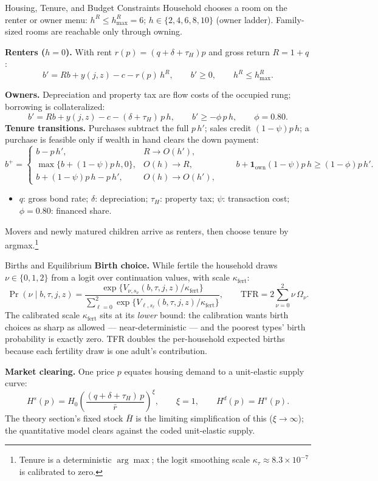 \documentclass[aspectratio=169,10pt]{beamer}
\providecommand{\1}{\mathbf 1}
\begin{document}
\begin{frame}{Housing, Tenure, and Budget Constraints}
  {\small Household chooses a room on the renter or owner menu: $h^R\le h^R_{\max}=6$; $h\in\{2,4,6,8,10\}$ (owner ladder). Family-sized rooms are reachable only through owning.}

  \textbf{Renters ($h=0$).} With rent $r(p)=(q+\delta+\tau_H)p$ and gross return $R=1+q$:
  \[
  b'=Rb+y(j,z)-c-r(p)\,h^R,\qquad b'\ge 0,\qquad h^R\le h^R_{\max}.
  \]

  \textbf{Owners.} Depreciation and property tax are flow costs of the occupied rung; borrowing is collateralized:
  \[
  b'=Rb+y(j,z)-c-(\delta+\tau_H)\,p\,h,\qquad b'\ge -\phi\,p\,h,\qquad \phi=0.80.
  \]
  \textbf{Tenure transitions.} Purchases subtract the full $p\,h'$; sales credit $(1-\psi)p\,h$; a purchase is feasible only if wealth in hand clears the down payment:
  \[
  b^+=
  \begin{cases}
  b-p\,h', & R\to O(h'),\\
  \max\{b+(1-\psi)p\,h,0\}, & O(h)\to R,\\
  b+(1-\psi)p\,h-p\,h', & O(h)\to O(h'),
  \end{cases}
  \qquad
  b+\1_{\mathrm{own}}(1-\psi)p\,h\ge (1-\phi)p\,h'.
  \]
  \begin{itemize}
    \item $q$: gross bond rate; $\delta$: depreciation; $\tau_H$: property tax; $\psi$: transaction cost; $\phi=0.80$: financed share.
  \end{itemize}
  Movers and newly matured children arrive as renters, then choose tenure by \mbox{argmax}.\footnote{Tenure is a deterministic $\arg\max$; the logit smoothing scale $\kappa_\tau\approx 8.3\times10^{-7}$ is calibrated to zero.}
\end{frame}

\begin{frame}{Births and Equilibrium}
  \textbf{Birth choice.} While fertile the household draws $\nu\in\{0,1,2\}$ from a logit over continuation values, with scale $\kappa_{\mathrm{fert}}$:
  \[
  \Pr(\nu\mid b,\tau,j,z)=\frac{\exp\{V_{\nu,s_\nu}(b,\tau,j,z)/\kappa_{\mathrm{fert}}\}}{\sum_{\ell=0}^{2}\exp\{V_{\ell,s_\ell}(b,\tau,j,z)/\kappa_{\mathrm{fert}}\}},
  \qquad
  \mathrm{TFR}=2\sum_{\nu=0}^{2}\nu\,\Omega_\nu.
  \]
  The calibrated scale $\kappa_{\mathrm{fert}}$ sits at its \emph{lower} bound: the calibration wants birth choices as sharp as allowed --- near-deterministic --- and the poorest types' birth probability is exactly zero. TFR doubles the per-household expected births because each fertility draw is one adult's contribution.

  \textbf{Market clearing.} One price $p$ equates housing demand to a unit-elastic supply curve:
  \[
  H^s(p)=H_0\left(\frac{(q+\delta+\tau_H)\,p}{\bar r}\right)^{\xi},\qquad \xi=1,\qquad H^d(p)=H^s(p).
  \]
  The theory section's fixed stock $\bar H$ is the limiting simplification of this ($\xi\to\infty$); the quantitative model clears against the coded unit-elastic supply.
\end{frame}
\end{document}

